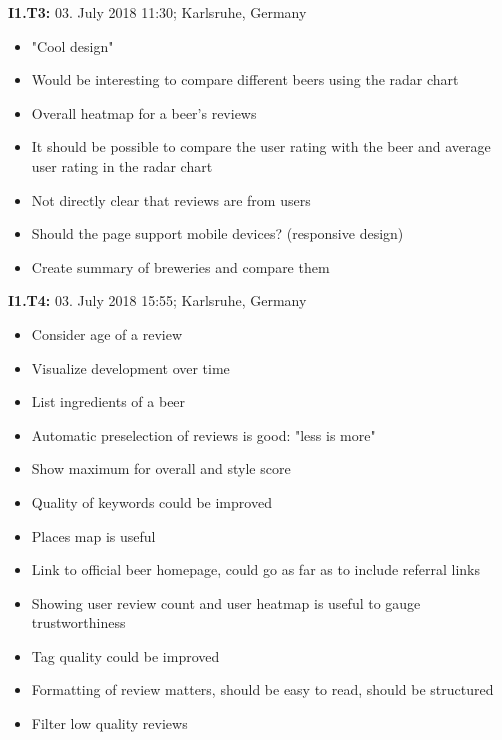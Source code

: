 \hfill

\begin{flushleft}
    \textbf{I1.T3:} 03. July 2018 11:30; Karlsruhe, Germany
    \begin{itemize}
        \item "Cool design"
        \item Would be interesting to compare different beers using the radar chart
        \item Overall heatmap for a beer's reviews
        \item It should be possible to compare the user rating with the beer and average user rating in the radar chart
        \item Not directly clear that reviews are from users
        \item Should the page support mobile devices? (responsive design)
        \item Create summary of breweries and compare them
    \end{itemize}
\end{flushleft}

\hfill

\begin{flushleft}
    \textbf{I1.T4:} 03. July 2018 15:55; Karlsruhe, Germany
    \begin{itemize}
        \item Consider age of a review
        \item Visualize development over time
        \item List ingredients of a beer
        \item Automatic preselection of reviews is good: "less is more"
        \item Show maximum for overall and style score
        \item Quality of keywords could be improved
        \item Places map is useful
        \item Link to official beer homepage, could go as far as to include referral links
        \item Showing user review count and user heatmap is useful to gauge trustworthiness
        \item Tag quality could be improved
        \item Formatting of review matters, should be easy to read, should be structured
        \item Filter low quality reviews
    \end{itemize}
\end{flushleft}


